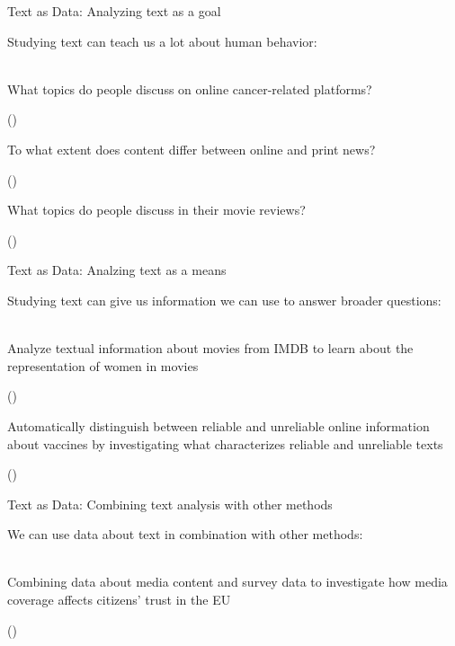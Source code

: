 \documentclass[handout]{beamer}
\begin{document}
\begin{frame}{Text as Data: \small{Analyzing text as a goal}}
	
	Studying text can teach us a lot about human behavior: \\~
	
	What topics do people discuss on online cancer-related platforms? \\
	\begin{tiny}
		(\cite{sanders_different_2020}) \\
	\end{tiny}

	To what extent does content differ between online and print news? \\
	\begin{tiny}
	(\cite{burggraaff_through_2020}) \\
	\end{tiny}

	What topics do people discuss in their movie reviews? \\
	\begin{tiny}
	(\cite{schneider_what_2020}) \\
	\end{tiny}	

\end{frame}


\begin{frame}{Text as Data: \small{Analzing text as a means}}
	
	Studying text can give us information we can use to answer broader questions: \\~
	
	Analyze textual information about movies from IMDB to learn about the representation of women in movies \\
	\begin{tiny}
	(\cite{poma-murialdo_gender_2019}) \\
	\end{tiny}

	Automatically distinguish between reliable and unreliable online information about vaccines by investigating what characterizes reliable and unreliable texts \\
	\begin{tiny}
	(\cite{meppelink_reliable_2021}) \\
	\end{tiny}	
	
	
\end{frame}


\begin{frame}{Text as Data: \small{Combining text analysis with other methods}}
	
	We can use data about text in combination with other methods: \\~
	
	Combining data about media content and survey data to investigate how media coverage affects citizens' trust in the EU \\
	\begin{tiny}
		(\cite{brosius_trust_2019}) \\
	\end{tiny}
	
	
\end{frame}
\end{document}
